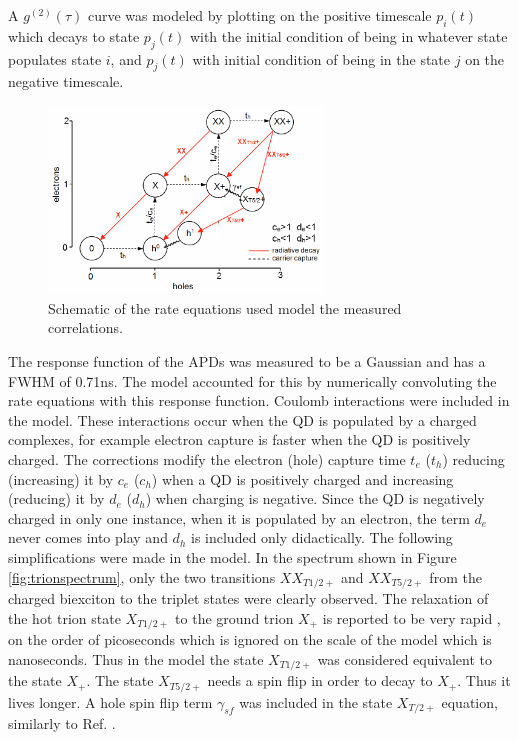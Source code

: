 \documentclass[12pt, twoside]{article}
\numberwithin{equation}{section}
\begin{document}
A $g^{(2)}(\tau)$ curve was modeled by plotting on the positive
timescale $p_{i}(t)$ which decays to state $p_j(t)$ with the initial
condition of being in whatever state populates state $i$, and $p_{j}(t)$
with initial condition of being in the state $j$ on the negative
timescale.

\begin{figure}[H]
    \centering
    \includegraphics[width=0.65\textwidth]{images/s.png}
    \caption{Schematic of the rate equations used model the measured correlations.}
    \label{fig:rateequationscheme}
\end{figure}

The response function of the APDs was measured to be a Gaussian and has
a FWHM of 0.71ns. The model accounted for this by numerically
convoluting the rate equations with this response function. Coulomb
interactions were included in the model. These interactions occur when
the QD is populated by a charged complexes, for example electron capture
is faster when the QD is positively charged. The corrections modify the
electron (hole) capture time $t_e$ ($t_h$) reducing (increasing) it by
$c_e$ ($c_h$) when a QD is positively charged and increasing (reducing)
it by $d_e$ ($d_h$) when charging is negative. Since the QD is
negatively charged in only one instance, when it is populated by an
electron, the term $d_e$ never comes into play and $d_h$ is included
only didactically. The following simplifications were made in the model.
In the spectrum shown in Figure \ref{fig:trionspectrum}, only the two
transitions $XX_{T1/2+}$ and $XX_{T5/2+}$ from the charged biexciton to
the triplet states were clearly observed. The relaxation of the hot
trion state $X_{T1/2+}$ to the ground trion $X_+$ is reported to be very
rapid \cite{ht3}, on the order of picoseconds which is ignored on the
scale of the model which is nanoseconds. Thus in the model the state
$X_{T1/2+}$ was considered equivalent to the state $X_{+}$. The state
$X_{T5/2+}$ needs a spin flip in order to decay to $X_+$. Thus it lives
longer. A hole spin flip term $\gamma_{sf}$ was included in the state
$X_{T/2+}$ equation, similarly to Ref. \cite{ht3}.
\end{document}
